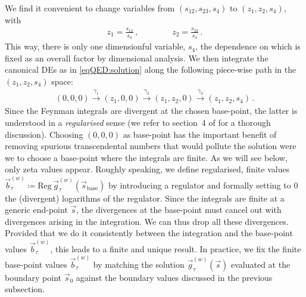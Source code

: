 \documentclass[main.tex]{subfiles}
\begin{document}
We find it convenient to change variables from $(s_{12},s_{23},s_4)$ to $(z_1,z_2,s_4)$, with
\begin{align}
z_1 = \frac{s_{12}}{s_4} \,, \qquad \qquad z_2 = \frac{s_{23}}{s_4} \,.
\end{align}
This way, there is only one dimensionful variable, $s_4$, the dependence on which is fixed as an overall factor by dimensional analysis.
We then integrate the canonical \acp{DE} as in \cref{eqQED:solution} along the following piece-wise path in the $(z_1,z_2,s_4)$ space:
\begin{align} \label{eqQED:path}
(0,0,0) \overset{\gamma_1}{\longrightarrow} (z_1, 0, 0)  \overset{\gamma_2}{\longrightarrow} (z_1, z_2, 0)  \overset{\gamma_3}{\longrightarrow} (z_1, z_2, s_4) \,.
\end{align}
Since the Feynman integrals are divergent at the chosen base-point, the latter is understood in a \emph{regularised} sense (we refer to section~4 of  for a thorough discussion).
Choosing $(0,0,0)$ as base-point has the important benefit of removing spurious transcendental numbers that would pollute the solution were we to choose a base-point where the integrals are finite. As we will see below, only zeta values appear.
Roughly speaking, we define regularised, finite values $\vec{b}^{(w)}_{\tau} \coloneqq \mathrm{Reg} \, \vec{g}^{(w)}_{\tau}(\vec{s}_{\mathrm{base}})$ by introducing a regulator and formally setting to $0$ the (divergent) logarithms of the regulator.
Since the integrals are finite at a generic end-point $\vec{s}$, the divergences at the base-point must cancel out with divergences arising in the integration. We can thus drop all these divergences. Provided that we do it consistently between the integration and the base-point values $\vec{b}^{(w)}_{\tau}$, this leads to a finite and unique result. In practice, we fix the finite base-point values $\vec{b}^{(w)}_{\tau}$ by matching the solution $\vec{g}^{(w)}_{\tau}(\vec{s})$ evaluated at the boundary point $\vec{s}_0$ against the boundary values discussed in the previous subsection. 
\end{document}

